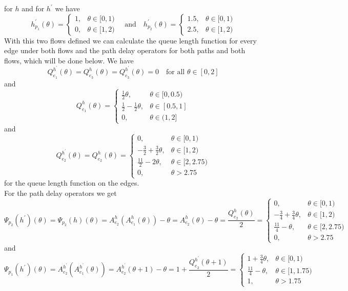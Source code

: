 \documentclass[reqno,openany]{amsbook}
\theoremstyle{definition}
\theoremstyle{plain}
\begin{document}
for $h$ and for $h^{\prime}$ we have 
\[h_{p_1}^{\prime}(\theta) = \begin{cases} 1,& \theta \in [0, 1) \\ 0,& \theta \in [1, 2) \end{cases} \quad \text{and} \quad h_{p_2}^{\prime}(\theta) = \begin{cases} 1.5,& \theta \in [0, 1) \\ 2.5,& \theta \in [1, 2)  \end{cases} \]
With this two flows defined we can calculate the queue length function for every edge under both flows and the path delay operators for both paths and both flows, which will be done below.
We have 
\[Q_{e_1}^{h^{\prime}}(\theta) = Q_{e_3}^h(\theta) = Q_{e_3}^{h^{\prime}}(\theta) = 0 \quad \text{for all $\theta \in [0, 2]$}\]
and
\[Q_{e_1}^h(\theta) = \begin{cases} \frac{1}{2}\theta,& \theta \in [0, 0.5) \\ \frac{1}{2} - \frac{1}{2}\theta,& \theta \in [0.5, 1]\\ 0,& \theta \in (1, 2] \end{cases} \]
and 
\[Q_{e_2}^{h^{\prime}}(\theta) = Q_{e_2}^h(\theta) = \begin{cases} 0,& \theta \in [0, 1) \\ -\frac{3}{2} + \frac{3}{2}\theta,& \theta \in [1, 2) \\ \frac{11}{2} - 2\theta,& \theta \in [2, 2.75) \\ 0,& \theta > 2.75 \end{cases}  \]
for the queue length function on the edges. \\
For the path delay operators we get 
\[ \Psi_{p_2}(h^{\prime})(\theta) = \Psi_{p_2}(h)(\theta) = A_{e_2}^h(A_{e_1}^h(\theta)) - \theta = A_{e_2}^h(\theta) - \theta =
\frac{Q_{e_2}^h(\theta)}{2} = \begin{cases} 0,& \theta \in [0, 1) \\ -\frac{3}{4} + \frac{3}{4}\theta,& \theta \in [1, 2) \\ \frac{11}{4} - \theta,& \theta \in [2, 2.75) \\ 0,& \theta > 2.75 \end{cases}  \]
and 
\[\Psi_{p_1}(h^{\prime})(\theta) = A_{e_2}^{h^{\prime}}(A_{e_1}^{h^{\prime}}(\theta)) = A_{e_2}^{h^{\prime}}(\theta + 1) - \theta = 1 + \frac{Q_{e_2}^{h^{\prime}}(\theta + 1)}{2} = \begin{cases} 1 + \frac{3}{4}\theta,& \theta \in [0, 1) \\ \frac{11}{4} - \theta,& \theta \in [1, 1.75) \\  1,& \theta > 1.75 \end{cases} \]
\end{document}
